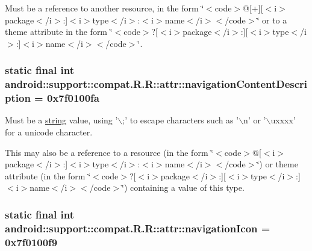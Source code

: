 Must be a reference to another resource, in the form \char`\"{}$<$code$>$@\mbox{[}+\mbox{]}\mbox{[}$<$i$>$package$<$/i$>$:\mbox{]}$<$i$>$type$<$/i$>$:$<$i$>$name$<$/i$>$$<$/code$>$\char`\"{} or to a theme attribute in the form \char`\"{}$<$code$>$?\mbox{[}$<$i$>$package$<$/i$>$:\mbox{]}\mbox{[}$<$i$>$type$<$/i$>$:\mbox{]}$<$i$>$name$<$/i$>$$<$/code$>$\char`\"{}. \hypertarget{classandroid_1_1support_1_1compat_1_1_r_1_1attr_3408d9bde4c2a7364e3ab0420d296462}{
\subsubsection[{navigationContentDescription}]{\setlength{\rightskip}{0pt plus 5cm}static final int android::support::compat.R.R::attr::navigationContentDescription = 0x7f0100fa}}
\label{classandroid_1_1support_1_1compat_1_1_r_1_1attr_3408d9bde4c2a7364e3ab0420d296462}


Must be a \hyperlink{classandroid_1_1support_1_1compat_1_1_r_1_1string}{string} value, using '$\backslash$;' to escape characters such as '$\backslash$n' or '$\backslash$uxxxx' for a unicode character. 

This may also be a reference to a resource (in the form \char`\"{}$<$code$>$@\mbox{[}$<$i$>$package$<$/i$>$:\mbox{]}$<$i$>$type$<$/i$>$:$<$i$>$name$<$/i$>$$<$/code$>$\char`\"{}) or theme attribute (in the form \char`\"{}$<$code$>$?\mbox{[}$<$i$>$package$<$/i$>$:\mbox{]}\mbox{[}$<$i$>$type$<$/i$>$:\mbox{]}$<$i$>$name$<$/i$>$$<$/code$>$\char`\"{}) containing a value of this type. \hypertarget{classandroid_1_1support_1_1compat_1_1_r_1_1attr_2fe2ed33a77ab2fffab06a7c605b6eeb}{
\subsubsection[{navigationIcon}]{\setlength{\rightskip}{0pt plus 5cm}static final int android::support::compat.R.R::attr::navigationIcon = 0x7f0100f9}}
\label{classandroid_1_1support_1_1compat_1_1_r_1_1attr_2fe2ed33a77ab2fffab06a7c605b6eeb}


